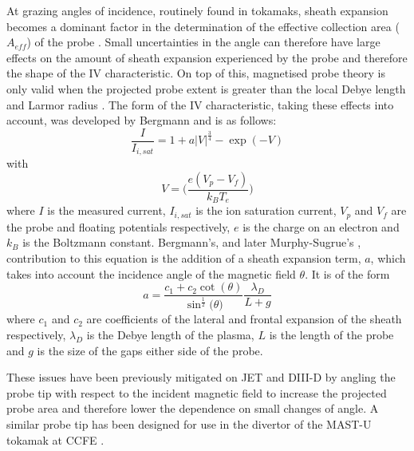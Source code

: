 \documentclass[a4paper, 11pt]{article} %
\begin{document}
	At grazing angles of incidence, routinely found in tokamaks, sheath expansion becomes a dominant factor in the determination of the effective collection area ($A_{eff}$) of the probe \cite{Bergmann1994}. 
	Small uncertainties in the angle can therefore have large effects on the amount of sheath expansion experienced by the probe and therefore the shape of the IV characteristic.
	On top of this, magnetised probe theory is only valid when the projected probe extent is greater than the local Debye length and Larmor radius \cite{Gunn1995}. 
	The form of the IV characteristic, taking these effects into account, was developed by Bergmann\cite{Bergmann2002} and is as follows:
	\begin{equation}
	\label{eq:ivcurvesheathexp}
	\frac{I}{I_{i,sat}} =  1 + a |V|^{\frac{3}{4}} - \exp\left({-V}\right)  
	\end{equation}
	with
	\begin{equation}
	V = \bigg(\frac{e(V_p - V_f)}{k_B T_e}\bigg)
	\end{equation}
	where $I$ is the measured current, $I_{i,sat}$ is the ion saturation current, $V_p$ and $V_f$ are the probe and floating potentials respectively, $e$ is the charge on an electron and $k_B$ is the Boltzmann constant. 
	Bergmann's, and later Murphy-Sugrue's \cite{Murphy-Sugrue2017}, contribution to this equation is the addition of a sheath expansion term, $a$, which takes into account the incidence angle of the magnetic field $\theta$. 
	It is of the form
	\begin{equation}
	\label{eq:sheathexpparam}
	a =  \frac{c_1 + c_2  \cot{(\theta)}}{\sin^{\frac{1}{2}}{(\theta})} \frac{\lambda_D}{L + g}
	\end{equation}
	where $c_1$ and $c_2$ are coefficients of the lateral and frontal expansion of the sheath respectively, $\lambda_D$ is the Debye length of the plasma, $L$ is the length of the probe and $g$ is the size of the gaps either side of the probe.
	
	These issues have been previously mitigated on JET\cite{Monk1996} and DIII-D by angling the probe tip with respect to the incident magnetic field to increase the projected probe area and therefore lower the dependence on small changes of angle. 
	A similar probe tip has been designed for use in the divertor of the MAST-U tokamak at CCFE \cite{Harrison}.
	
\end{document}
